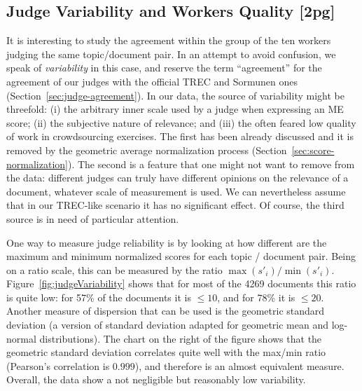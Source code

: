 \subsection{Judge Variability and Workers Quality [2pg]}
\label{sec:workers-quality}


It is %
interesting to study the agreement within the group of the
ten workers judging the same topic/document pair. 
In an attempt to avoid confusion, we speak of \emph{variability} in
this case, and reserve the term ``agreement'' for the agreement of our
judges with the official TREC and Sormunen ones
(Section~\ref{sec:judge-agreement}).
In our data, the source of variability might be threefold: (i) the
arbitrary inner scale used by a judge when expressing an ME score;
(ii) the subjective nature of relevance; and (iii) the often feared
low quality of work in crowdsourcing exercises. 
The first has been already discussed and it is removed by the
geometric average normalization process
(Section~\ref{sec:score-normalization}). 
The second is a feature that one might not want to remove from the
data: different judges can truly have different opinions on the
relevance of a document, whatever scale of measurement is used. 
We can nevertheless assume that in our TREC-like scenario it has no
significant effect. 
Of course, the third source is in need of particular attention. 

One way to measure judge reliability is by looking at how different
are the maximum and minimum normalized scores for each topic /
document pair. 
Being on a ratio scale, this can be measured by the ratio
$\max(s'_i) / \min(s'_i)$. 
Figure~\ref{fig:judgeVariability} shows that for most of the 4269
documents this ratio is quite low: for 57\% of the documents it is
$\leq 10$, and for 78\% it is $\leq 20$.
Another measure of dispersion that can be used is the geometric
standard deviation (a version of standard deviation adapted for
geometric mean and log-normal distributions). 
The chart on the right of the figure shows that the geometric standard
deviation correlates quite well with the max/min ratio (Pearson's
correlation is $0.999$), and therefore is an almost equivalent
measure. 
Overall, the data show a not negligible but reasonably low variability.


